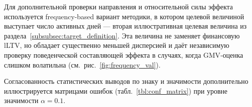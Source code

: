 Для дополнительной проверки направления и относительной силы эффекта
используется frequency‑based вариант методики, в котором целевой
величиной выступает число активных дней — вторая иллюстративная
целевая величина из раздела~\ref{subsubsec:target_definition}. Эта
величина не заменяет финансовую lLTV, но обладает существенно меньшей
дисперсией и даёт независимую проверку поведенческой составляющей
эффекта в случаях, когда GMV‑оценка слишком волатильна
(см.~рис.~\ref{fig:frequency_val}).

Согласованность статистических выводов по знаку и значимости
дополнительно иллюстрируется матрицами ошибок
(табл.~\ref{tbl:conf_matrix}) при уровне значимости $\alpha = 0.1$.

